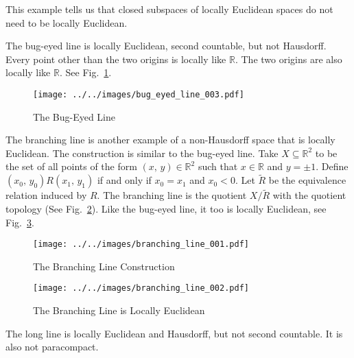 \documentclass{article}
\theoremstyle{plain}
\theoremstyle{normal}
\newenvironment{example}{%
    \pushQED{\qed}\renewcommand{\qedsymbol}{$\blacksquare$}\examplex%
}{%
    \popQED\endexamplex%
}
\begin{document}
        This example tells us that closed subspaces of locally Euclidean spaces
        do not need to be locally Euclidean.
        \begin{example}
            The bug-eyed line is locally Euclidean, second countable, but not
            Hausdorff. Every point other than the two origins is locally like
            $\mathbb{R}$. The two origins are also locally like $\mathbb{R}$.
            See Fig.~\ref{fig:bug_eyed_line}.
        \end{example}
        \begin{figure}
            \centering
            \texttt{[image: ../../images/bug\_eyed\_line\_003.pdf]}
            \caption{The Bug-Eyed Line}
            \label{fig:bug_eyed_line}
        \end{figure}
        \begin{example}
            The branching line is another example of a non-Hausdorff space that
            is locally Euclidean. The construction is similar to the bug-eyed
            line. Take $X\subseteq\mathbb{R}^{2}$ to be the set of all points
            of the form $(x,\,y)\in\mathbb{R}^{2}$ such that $x\in\mathbb{R}$
            and $y=\pm{1}$. Define $(x_{0},\,y_{0})R(x_{1},\,y_{1})$ if and
            only if $x_{0}=x_{1}$ and $x_{0}<0$. Let $\tilde{R}$ be the
            equivalence relation induced by $R$. The branching line is the
            quotient $X/\tilde{R}$ with the quotient topology
            (See Fig.~\ref{fig:branching_line_001}). Like the bug-eyed line,
            it too is locally Euclidean, see Fig.~\ref{fig:branching_line_002}.
        \end{example}
        \begin{figure}
            \centering
            \texttt{[image: ../../images/branching\_line\_001.pdf]}
            \caption{The Branching Line Construction}
            \label{fig:branching_line_001}
        \end{figure}
        \begin{figure}
            \centering
            \texttt{[image: ../../images/branching\_line\_002.pdf]}
            \caption{The Branching Line is Locally Euclidean}
            \label{fig:branching_line_002}
        \end{figure}
        \begin{example}
            The long line is locally Euclidean and Hausdorff, but not
            second countable. It is also not paracompact.
        \end{example}
\end{document}
